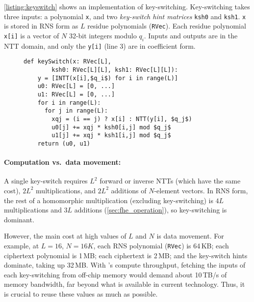 \autoref{listing:keyswitch} shows an implementation of key-switching.
Key-switching takes three inputs: a polynomial \texttt{x}, and two \emph{key-switch hint matrices} \texttt{ksh0} and \texttt{ksh1}. 
\texttt{x} is stored in RNS form as $L$ residue polynomials (\texttt{RVec}). Each residue polynomial \texttt{x[i]}
is a vector of $N$ 32-bit integers modulo $q_i$.
Inputs and outputs are in the NTT domain, and only the \texttt{y[i]} (line 3) are in coefficient form.


\begin{figure}[h]
\begin{center}
  \begin{lstlisting}[caption={Key-switch implementation. \texttt{RVec} is an $N$-element vector of 32-bit values, storing a single RNS polynomial in either the coefficient or the NTT domain. %Inputs and outputs are in the NTT domain. 
    %RVec[L] is a vector of L RNS polynomials representing a full ciphertext polynomial; RVec[L][L] is an L$\times$L matrix. + and * operations on RVec are element-wise and modular.
    }, mathescape=true, style=custompython, label=listing:keyswitch]
  def keySwitch(x: RVec[L], 
        ksh0: RVec[L][L], ksh1: RVec[L][L]):
    y = [INTT(x[i],$q_i$) for i in range(L)]
    u0: RVec[L] = [0, ...]
    u1: RVec[L] = [0, ...]
    for i in range(L):
      for j in range(L):
        xqj = (i == j) ? x[i] : NTT(y[i], $q_j$)
        u0[j] += xqj * ksh0[i,j] mod $q_j$
        u1[j] += xqj * ksh1[i,j] mod $q_j$
    return (u0, u1)
  \end{lstlisting}
\end{center}
\end{figure}


\paragraph{Computation vs.\ data movement:}
A single key-switch requires $L^2$ forward or inverse NTTs (which have the same cost),
$2L^2$ multiplications, and $2L^2$ additions of $N$-element vectors.
In RNS form, the rest of a homomorphic multiplication (excluding key-switching)
is $4L$ multiplications and $3L$ additions (\autoref{sec:fhe_operation}), so key-switching is dominant.

However, the main cost at high values of $L$ and $N$ is data movement. 
For example, at $L = 16$, $N = 16K$, each RNS polynomial (\texttt{RVec}) is 64\,KB; 
each ciphertext polynomial is 1\,MB; each ciphertext is 2\,MB; and
the key-switch hints dominate, taking up 32\,MB.
With \name's compute throughput,
fetching the inputs of each key-switching from off-chip memory would demand
about 10\,TB/s of memory bandwidth, far beyond what is available in current technology.
Thus, it is crucial to reuse these values as much as possible.


